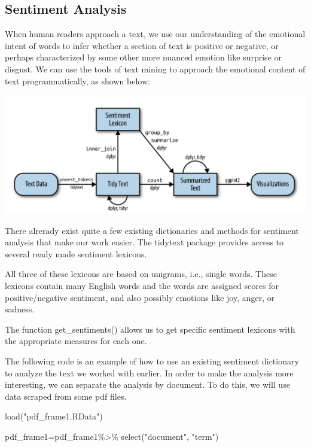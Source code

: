 \documentclass[
  letterpaper,
  DIV=11,
  numbers=noendperiod]{scrartcl}
\newenvironment{Shaded}{\begin{snugshade}}{\end{snugshade}}
\newcommand{\FunctionTok}[1]{\textcolor[rgb]{0.28,0.35,0.67}{#1}}
\newcommand{\NormalTok}[1]{\textcolor[rgb]{0.00,0.23,0.31}{#1}}
\newcommand{\OtherTok}[1]{\textcolor[rgb]{0.00,0.23,0.31}{#1}}
\newcommand{\SpecialCharTok}[1]{\textcolor[rgb]{0.37,0.37,0.37}{#1}}
\newcommand{\StringTok}[1]{\textcolor[rgb]{0.13,0.47,0.30}{#1}}
\begin{document}
\hypertarget{sentiment-analysis}{%
\subsection{Sentiment Analysis}\label{sentiment-analysis}}

When human readers approach a text, we use our understanding of the
emotional intent of words to infer whether a section of text is positive
or negative, or perhaps characterized by some other more nuanced emotion
like surprise or disgust. We can use the tools of text mining to
approach the emotional content of text programmatically, as shown below:

\includegraphics{Images/5.png}

There alrerady exist quite a few existing dictionaries and methods for
sentiment analysis that make our work easier. The tidytext package
provides access to several ready made sentiment lexicons.

All three of these lexicons are based on unigrams, i.e., single words.
These lexicons contain many English words and the words are assigned
scores for positive/negative sentiment, and also possibly emotions like
joy, anger, or sadness.

The function get\_sentiments() allows us to get specific sentiment
lexicons with the appropriate measures for each one.

The following code is an example of how to use an existing sentiment
dictionary to analyze the text we worked with earlier. In order to make
the analysis more interesting, we can separate the analysis by document.
To do this, we will use data scraped from some pdf files.

\begin{Shaded}
\begin{Highlighting}[]
\FunctionTok{load}\NormalTok{(}\StringTok{"pdf\_frame1.RData"}\NormalTok{)}

\NormalTok{pdf\_frame1}\OtherTok{=}\NormalTok{pdf\_frame1}\SpecialCharTok{\%\textgreater{}\%}
  \FunctionTok{select}\NormalTok{(}\StringTok{"document"}\NormalTok{, }\StringTok{"term"}\NormalTok{)}
\end{Highlighting}
\end{Shaded}
\end{document}
